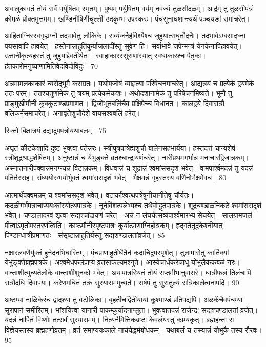 अवालुकागतं तोयं सर्वं पर्युषितम् स्मृतम्।
पुष्पम् पर्युषितम् वय॑म् नवज्यं तुळसीदळम्।
आर्द्रम् तु तुळसीपत्रं कोमळं प्रोक्तमुत्तमम्।
खण्डिनीषिणीचुल्ली उदकुम्भ उपस्करः।
पंचसूनाघशान्त्यर्थं पञ्चयङां समाचरेत्।

आहिताग्निस्स्वगृह्यग्नौ तदभावेतु लौकिके।
सव्यंजनैर्हविश्यैश्च जुहुयात्सघृतौदनैः।
तदभावेऽम्बसादध्ना पयसावापि हावयेत्।
हस्तेनान्नाहुतिंकुर्याजलादींस्तु सुवेण हि।
सर्वाभावे जपेन्मन्त्रं येनकेनापिहावयेत्।
उत्तानीकृत्यहस्तं तु जुहुयाद्देवतीर्थतः।
स्वाहाकारस्सुराणांस्यात् स्वधाकारश्च पैतृकः।
हंतकारोमनुष्याणामितिवेदविदोविदुः।
70

अन्नमामलकाकारं न्यसेद्भूमै कराग्रतः।
यथोपजोषं व्याहृत्या परिषेचनमाचरेत्।
आद्यत्रयं च प्रत्येकं द्वयमेकं ततः परम्।
ततश्चतुर्णामेकं तु त्रयम् प्रत्येकमेकशः।
अथोदशानामेकं तु परिषेचनमिष्यते।
भूमौ तु प्राङ्मुखीमौनी कुक्कुटाण्डप्रमाणतः।
द्विजोभूतबलिंचैव प्रक्षिपेच्च विधानतः।
कालद्वये दिवारात्रौ बलिकर्मसमाचरेत्।
अनावृतेशुचौदेशे वायसश्वबलिं हरेत्।

रिक्तो बिक्षात्रयं दद्यादुपपन्नोयथाबलम्।
75

अघृतं कीटकेशादि दुष्टं भुक्त्वा पतेन्नरः।
स्त्रीपुत्रपात्रेह्यशुचौ बालेनसहभार्यया।
हस्तदत्तं चान्यशेषं स्त्रीशूद्रश्राद्धशेषितम्।
अनुष्टान्नं च येभुङ्क्ते व्रतश्चान्द्रायणंचरेत्।
नारीप्रथमगर्भान्न मनाचारद्विजान्नकम्।
अस्नातनारीपक्वान्नमनग्न्यन्नं विटान्नकम्।
विधवान्नं च शूद्रान्नं श्वमांससदृशं भवेत्।
वामपार्श्वमदन्नं तु यदन्नं पतितैस्सह।
संध्ययोरुभयोर्भुक्तं श्वमांससदृशं भवेत्।
भैक्षमन्नं गृहस्तस्य वर्णिनोभैक्षमेवच।
80

आत्मार्थेपक्वमन्नम् च श्वमांससदृशं भवेत्।
वटार्काश्वत्थपत्रेषुनीचानीतेषु चौर्यतः।
कदळीगर्भपत्राचाप्ययःकांस्योत्थपात्रके।
नूनेविंशत्पलेभ्यश्च तथैवोद्धृतपात्रके।
शूद्रचण्डाळनिकटे श्वमांससदृशं भवेत्।
चण्डालादरवं शृत्वा सद्यश्चांद्रायणं चरेत्।
अन्नं न लंघयेत्सव्यंपार्श्वमारभ्य सेचयेत्।
सालग्रामजलं पीत्वाऽमृतोपस्तरणंत्विति।
काष्ठमौनीस्पृष्टपात्रः कुर्यात्प्राणाग्निहोत्रकम्।
हृद्गतेतूदकेश्नीयात् पिण्डान्धात्रीप्रमाणतः।
संसृष्टान्नाहुतिर्यस्तु सद्यशण्डालतांव्रजेत्।
85


नक्षारलवणैर्युक्तं हुनेदनभिघारितम्।
पंचप्राणाहुतीर्धेतैर्न कदाचिदुपस्पृशेत्।
तुलामासेतु कार्तिक्यां येभुङ्क्तेब्रह्मपत्रके।
अश्वमेधफलंप्राप्य व्रतसाफल्यमश्नुते।
आस्येचार्धंकरेचाधू योभुलैककबळं नरः।
वान्ताशीत्युच्यतेलोके वान्ताशीशुनको भवेत्।
अयःपात्रस्थितं तोयं सप्तमीभानुवासरे।
धात्रीफलं तिलंचापि रात्रौदधि दिवापयः।
करेणमधितं तक्रं सुरयासममुच्यते।
सर्षपं तु सुरातुल्यं रात्रिकालेत्वनापदि।
90

अष्टम्यां नाळिकेरंच द्वादश्यां तु वटोलिका।
बृहतीचद्वितीयायां कूश्माण्डं प्रतिपद्यपि।
अळर्कंचैवपंचम्यां सुरापानं समीरितम्।
भांशयित्वा यानारी पाकम्कुर्यादनाप्लुता।
भुक्त्वातदन्नं राजेन्द्र! सद्यश्चण्डालतां व्रजेत्।
यदन्नं नार्पितं विष्णोः तत्सर्वं सुरयासमम्।
नित्यनैमित्तिकब्रष्टः केवलंयस्तु काम्यकृत्।
ब्रह्महन्ता स विज्ञेयस्तस्य ब्रह्महणोव्रतम्।
व्रतं समाप्ययःकाले नार्चयेद्धर्मबोधकम्।
यथाबलं च तस्यान्नं योभुकै तस्य रौरवः।
95


